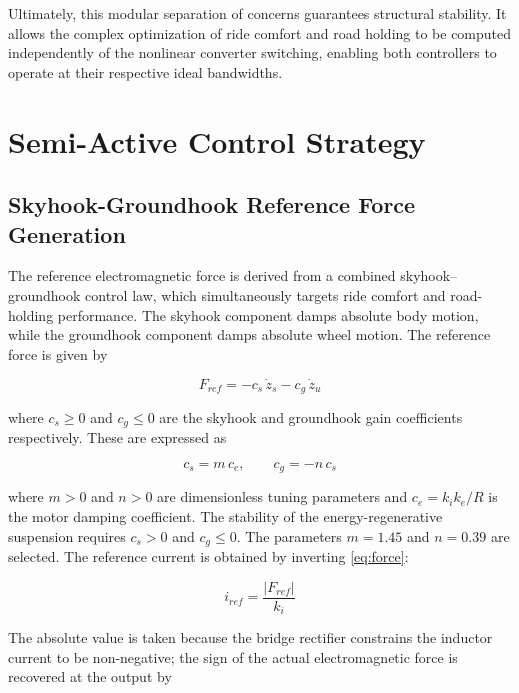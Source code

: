 Ultimately, this modular separation of concerns guarantees structural stability. It allows the complex optimization of ride comfort and road holding to be computed independently of the nonlinear converter switching, enabling both controllers to operate at their respective ideal bandwidths.



\section{Semi-Active Control Strategy}
\label{sec:semi_active}

\subsection{Skyhook-Groundhook Reference Force Generation}
\label{subsec:frefsg}

The reference electromagnetic force is derived from a combined
skyhook--groundhook control law, which simultaneously targets ride
comfort and road-holding performance. The skyhook component damps
absolute body motion, while the groundhook component damps absolute
wheel motion. The reference force is given by

\begin{equation}
    F_{ref} = -c_s\,\dot{z}_s - c_g\,\dot{z}_u
    \label{eq:fref}
\end{equation}

where $c_s \geq 0$ and $c_g \leq 0$ are the skyhook and groundhook
gain coefficients respectively. These are expressed as

\begin{equation}
    c_s = m\,c_e, \qquad c_g = -n\,c_s
    \label{eq:gains}
\end{equation}

where $m > 0$ and $n > 0$ are dimensionless tuning parameters and
$c_e = k_i k_e / R$ is the motor damping coefficient. The stability
of the energy-regenerative suspension requires $c_s > 0$ and
$c_g \leq 0$. The parameters $m = 1.45$ and $n = 0.39$
are selected. The reference current is obtained by inverting \cref{eq:force}:

\begin{equation}
    i_{ref} = \frac{|F_{ref}|}{k_i}
    \label{eq:iref}
\end{equation}

The absolute value is taken because the bridge rectifier constrains
the inductor current to be non-negative; the sign of the actual
electromagnetic force is recovered at the output by

